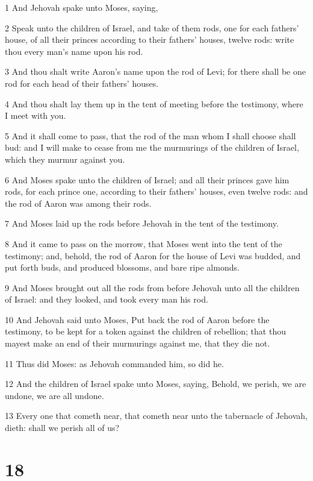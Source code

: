 \par 1 And Jehovah spake unto Moses, saying,
\par 2 Speak unto the children of Israel, and take of them rods, one for each fathers' house, of all their princes according to their fathers' houses, twelve rods: write thou every man's name upon his rod.
\par 3 And thou shalt write Aaron's name upon the rod of Levi; for there shall be one rod for each head of their fathers' houses.
\par 4 And thou shalt lay them up in the tent of meeting before the testimony, where I meet with you.
\par 5 And it shall come to pass, that the rod of the man whom I shall choose shall bud: and I will make to cease from me the murmurings of the children of Israel, which they murmur against you.
\par 6 And Moses spake unto the children of Israel; and all their princes gave him rods, for each prince one, according to their fathers' houses, even twelve rods: and the rod of Aaron was among their rods.
\par 7 And Moses laid up the rods before Jehovah in the tent of the testimony.
\par 8 And it came to pass on the morrow, that Moses went into the tent of the testimony; and, behold, the rod of Aaron for the house of Levi was budded, and put forth buds, and produced blossoms, and bare ripe almonds.
\par 9 And Moses brought out all the rods from before Jehovah unto all the children of Israel: and they looked, and took every man his rod.
\par 10 And Jehovah said unto Moses, Put back the rod of Aaron before the testimony, to be kept for a token against the children of rebellion; that thou mayest make an end of their murmurings against me, that they die not.
\par 11 Thus did Moses: as Jehovah commanded him, so did he.
\par 12 And the children of Israel spake unto Moses, saying, Behold, we perish, we are undone, we are all undone.
\par 13 Every one that cometh near, that cometh near unto the tabernacle of Jehovah, dieth: shall we perish all of us?

\chapter{18}

